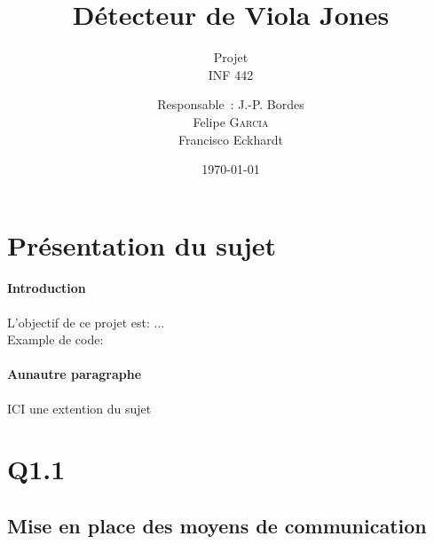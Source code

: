 \documentclass[a4paper, 12pt,twoside]{article}
\title{Détecteur de Viola Jones}
\subtitle{Projet \\ INF 442}
\author{
	Responsable~: J.-P. Bordes \\
        Felipe \textsc{Garcia} \\
        Francisco Eckhardt \\
        }
\date\today
\newcommand{\code}[2]{
  \hrulefill
  \subsection*{#1}
  
  \vspace{2em}
}
\begin{document}
    \maketitle
    \renewcommand{\baselinestretch}{1.1}
    \setlength{\parskip}{0.5em}
    \tableofcontents
    \clearpage

\section{Présentation du sujet}

\paragraph{Introduction} 
L'objectif de ce projet est: ...\\
Example de code:


%	
%  
%  
%
%


\paragraph{Aunautre paragraphe}

        ICI une extention du sujet

    \clearpage
    
\section{Q1.1}

        \subsection{Mise en place des moyens de communication}
\end{document}
